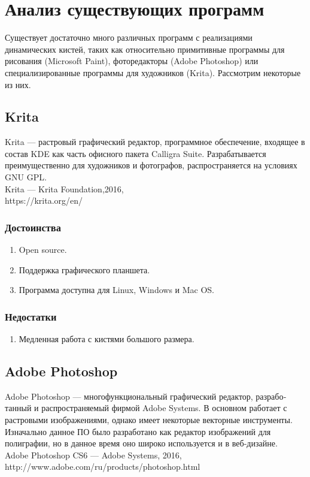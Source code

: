 \clearpage
\section{Анализ существующих программ}
Существует достаточно много различных программ с реализациями динамических кистей, таких как относительно примитивные программы для рисования (Microsoft Paint), фоторедакторы (Adobe Photoshop) или специализированные программы для художников (Krita). Рассмотрим некоторые из них.

\subsection{Krita}
Krita — растровый графический редактор, программное обеспечение, входящее в состав KDE как часть офисного пакета Calligra Suite. Разрабатывается преимущественно для художников и фотографов, распространяется на условиях GNU GPL.\\
Krita — Krita Foundation,2016,\\
https://krita.org/en/\\
\subsubsection{Достоинства}
\begin{enumerate}
	\item Open source.
	\item Поддержка графического планшета.
	\item Программа доступна для Linux, Windows и Mac OS.
\end{enumerate}

\subsubsection{Недостатки}
\begin{enumerate}
	\item Медленная работа с кистями большого размера.
\end{enumerate}

\subsection{Adobe Photoshop}
Adobe Photoshop — многофункциональный графический редактор, разрабо­танный и распространяемый фирмой Adobe Systems. В основном работает с растро­выми изображениями, однако имеет некоторые векторные инструменты. Изначально данное ПО было разработано как редактор изображений для полиграфии, но в дан­ное время оно широко используется и в веб-дизайне.\\
Adobe Photoshop CS6 — Adobe Systems, 2016,\\
http://www.adobe.com/ru/products/photoshop.html\\

